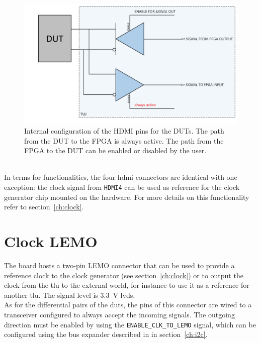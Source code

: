 \begin{figure}
  \centering
  \includegraphics[width=.80\textwidth]{./Images/LVDS_transceiver.pdf}
  \caption{Internal configuration of the HDMI pins for the DUTs. The path from the DUT to the FPGA is always active. The path from the FPGA to the DUT can be enabled or disabled by the user.}\label{fig:LVDSTransceiver}
\end{figure}\\
In terms for functionalities, the four \gls{hdmi} connectors are identical with one exception: the clock signal from \verb|HDMI4| can be used as reference for the clock generator chip mounted on the hardware. For more details on this functionality refer to section~\ref{ch:clock}.

\section{Clock LEMO}
The board hosts a two-pin LEMO connector that can be used to provide a reference clock to the clock generator (see section~\ref{ch:clock}) or to output the clock from the \gls{tlu} to the external world, for instance to use it as a reference for another \gls{tlu}. The signal level is 3.3~V \gls{lvds}.\\
As for the differential pairs of the \gls{dut}s, the pins of this connector are wired to a transceiver configured to always accept the incoming signals. The outgoing direction must be enabled by using the \verb|ENABLE_CLK_TO_LEMO| signal, which can be configured using the bus expander described in in section~\ref{ch:i2c}.

